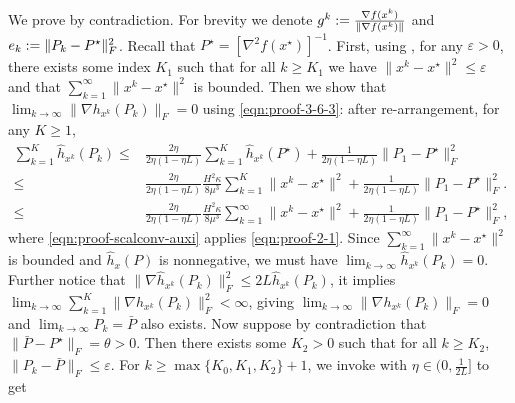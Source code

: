 We prove by contradiction.
For brevity we denote $g^k := \tfrac{\nabla f (x^k)}{\| \nabla f (x^k)
\|}$ and $e_k := \| P_k - P^{\star} \|_F^2$. Recall that
$P^{\star} = [\nabla^2 f (x^{\star})]^{- 1}$. First, using , for any $\varepsilon > 0$, there exists some index $K_1$ such that for
all $k \geq K_1$ we have $\| x^k - x^{\star} \|^2 \leq \varepsilon$ and that
$\textstyle \sum_{k = 1}^{\infty} \| x^k - x^{\star} \|^2$ is bounded. 
Then we show that $\lim_{k \rightarrow \infty} \| \nabla h_{x^k} (P_k) \|_F =
0$ using \eqref{eqn:proof-3-6-3}: after re-arrangement, for any $K \geq 1$,
\begin{align}
  \textstyle \sum_{k = 1}^K \hat{h}_{x^k} (P_k) \leq{} & \tfrac{2 \eta}{2 \eta (1 - \eta
  L)} \textstyle \sum_{k = 1}^K \hat{h}_{x^k} (P^{\star}) + \tfrac{1}{2 \eta (1 - \eta
  L)} \| P_1 - P^{\star} \|_F^2 \nonumber\\
  \leq{} & \tfrac{2 \eta}{2 \eta (1 - \eta L)} \tfrac{H^2 \kappa}{8 \mu^3}
  \textstyle \sum_{k = 1}^K \| x^k - x^{\star} \|^2 + \tfrac{1}{2 \eta (1 - \eta L)} \|
  P_1 - P^{\star} \|_F^2 . \label{eqn:proof-scalconv-auxi}\\
  \leq{} & \tfrac{2 \eta}{2 \eta (1 - \eta L)} \tfrac{H^2 \kappa}{8 \mu^3}
  \textstyle \sum_{k = 1}^{\infty} \| x^k - x^{\star} \|^2 + \tfrac{1}{2 \eta (1 - \eta
  L)} \| P_1 - P^{\star} \|_F^2, \nonumber
\end{align}
where \eqref{eqn:proof-scalconv-auxi} applies \eqref{eqn:proof-2-1}. Since $\textstyle \sum_{k = 1}^{\infty} \| x^k - x^{\star} \|^2$ is bounded and
$\hat{h}_x (P)$ is nonnegative, we must have $\lim_{k \rightarrow \infty}
\hat{h}_{x^k} (P_k) = 0$. Further notice that $\| \nabla \hat{h}_{x^k} (P_k) \|_F^2 \leq 2 L
\hat{h}_{x^k} (P_k)$, it implies $\lim_{k \rightarrow \infty} \sum_{k=1}^K \| \nabla
h_{x^k} (P_k) \|_F^2 < \infty$, giving $\lim_{k \rightarrow \infty} \| \nabla
h_{x^k} (P_k) \|_F = 0$ and $\lim_{k \rightarrow \infty} P_k = \bar{P}$ also
exists. Now suppose by contradiction that $\| \bar{P} - P^{\star} \|_F = \theta
> 0$. Then there exists some $K_2 > 0$ such that for all $k \geq K_2$, $\| P_k
- \bar{P} \|_F \leq \varepsilon$. For $k \geq \max \{ K_0, K_1, K_2 \} + 1$, we invoke  with $\eta \in (0, \frac{1}{2L}]$ to get
